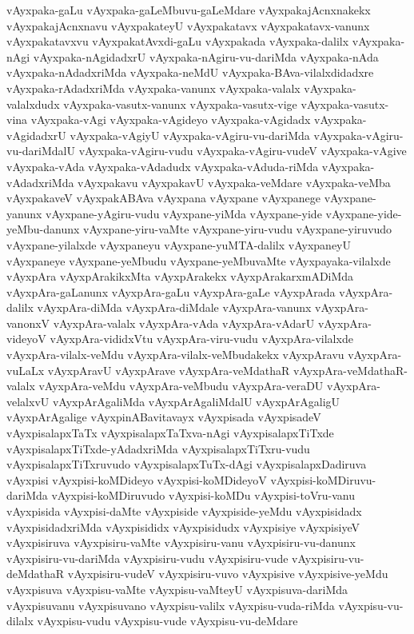 {vAyxpaka-gaLu
vAyxpaka-gaLeMbuvu-gaLeMdare
vAyxpakajAcnxnakekx
vAyxpakajAcnxnavu
vAyxpakateyU
vAyxpakatavx
vAyxpakatavx-vanunx
vAyxpakatavxvu
vAyxpakatAvxdi-gaLu
vAyxpakada
vAyxpaka-dalilx
vAyxpaka-nAgi
vAyxpaka-nAgidadxrU
vAyxpaka-nAgiru-vu-dariMda
vAyxpaka-nAda
vAyxpaka-nAdadxriMda
vAyxpaka-neMdU
vAyxpaka-BAva-vilalxdidadxre
vAyxpaka-rAdadxriMda
vAyxpaka-vanunx
vAyxpaka-valalx
vAyxpaka-valalxdudx
vAyxpaka-vasutx-vanunx
vAyxpaka-vasutx-vige
vAyxpaka-vasutx-vina
vAyxpaka-vAgi
vAyxpaka-vAgideyo
vAyxpaka-vAgidadx
vAyxpaka-vAgidadxrU
vAyxpaka-vAgiyU
vAyxpaka-vAgiru-vu-dariMda
vAyxpaka-vAgiru-vu-dariMdalU
vAyxpaka-vAgiru-vudu
vAyxpaka-vAgiru-vudeV
vAyxpaka-vAgive
vAyxpaka-vAda
vAyxpaka-vAdadudx
vAyxpaka-vAduda-riMda
vAyxpaka-vAdadxriMda
vAyxpakavu
vAyxpakavU
vAyxpaka-veMdare
vAyxpaka-veMba
vAyxpakaveV
vAyxpakABAva
vAyxpana
vAyxpane
vAyxpanege
vAyxpane-yanunx
vAyxpane-yAgiru-vudu
vAyxpane-yiMda
vAyxpane-yide
vAyxpane-yide-yeMbu-danunx
vAyxpane-yiru-vaMte
vAyxpane-yiru-vudu
vAyxpane-yiruvudo
vAyxpane-yilalxde
vAyxpaneyu
vAyxpane-yuMTA-dalilx
vAyxpaneyU
vAyxpaneye
vAyxpane-yeMbudu
vAyxpane-yeMbuvaMte
vAyxpayaka-vilalxde
vAyxpAra
vAyxpArakikxMta
vAyxpArakekx
vAyxpArakarxmADiMda
vAyxpAra-gaLanunx
vAyxpAra-gaLu
vAyxpAra-gaLe
vAyxpArada
vAyxpAra-dalilx
vAyxpAra-diMda
vAyxpAra-diMdale
vAyxpAra-vanunx
vAyxpAra-vanonxV
vAyxpAra-valalx
vAyxpAra-vAda
vAyxpAra-vAdarU
vAyxpAra-videyoV
vAyxpAra-vididxVtu
vAyxpAra-viru-vudu
vAyxpAra-vilalxde
vAyxpAra-vilalx-veMdu
vAyxpAra-vilalx-veMbudakekx
vAyxpAravu
vAyxpAra-vuLaLx
vAyxpAravU
vAyxpArave
vAyxpAra-veMdathaR
vAyxpAra-veMdathaR-valalx
vAyxpAra-veMdu
vAyxpAra-veMbudu
vAyxpAra-veraDU
vAyxpAra-velalxvU
vAyxpArAgaliMda
vAyxpArAgaliMdalU
vAyxpArAgaligU
vAyxpArAgalige
vAyxpinABavitavayx
vAyxpisada
vAyxpisadeV
vAyxpisalapxTaTx
vAyxpisalapxTaTxva-nAgi
vAyxpisalapxTiTxde
vAyxpisalapxTiTxde-yAdadxriMda
vAyxpisalapxTiTxru-vudu
vAyxpisalapxTiTxruvudo
vAyxpisalapxTuTx-dAgi
vAyxpisalapxDadiruva
vAyxpisi
vAyxpisi-koMDideyo
vAyxpisi-koMDideyoV
vAyxpisi-koMDiruvu-dariMda
vAyxpisi-koMDiruvudo
vAyxpisi-koMDu
vAyxpisi-toVru-vanu
vAyxpisida
vAyxpisi-daMte
vAyxpiside
vAyxpiside-yeMdu
vAyxpisidadx
vAyxpisidadxriMda
vAyxpisididx
vAyxpisidudx
vAyxpisiye
vAyxpisiyeV
vAyxpisiruva
vAyxpisiru-vaMte
vAyxpisiru-vanu
vAyxpisiru-vu-danunx
vAyxpisiru-vu-dariMda
vAyxpisiru-vudu
vAyxpisiru-vude
vAyxpisiru-vu-deMdathaR
vAyxpisiru-vudeV
vAyxpisiru-vuvo
vAyxpisive
vAyxpisive-yeMdu
vAyxpisuva
vAyxpisu-vaMte
vAyxpisu-vaMteyU
vAyxpisuva-dariMda
vAyxpisuvanu
vAyxpisuvano
vAyxpisu-valilx
vAyxpisu-vuda-riMda
vAyxpisu-vu-dilalx
vAyxpisu-vudu
vAyxpisu-vude
vAyxpisu-vu-deMdare
}
